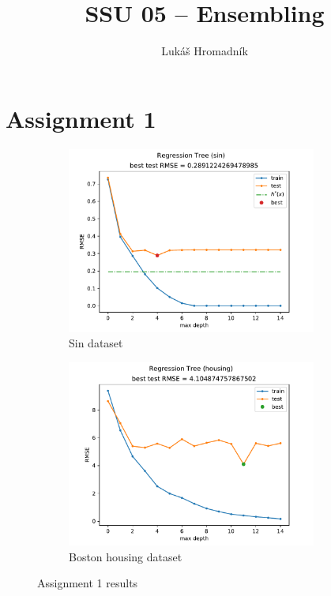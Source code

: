 \documentclass[12pt]{article}
\begin{document}
\title{SSU 05 – Ensembling}
\author{Lukáš Hromadník}
\date{}

\pagestyle{empty}
\maketitle
\thispagestyle{empty}

\pagestyle{plain}


\section{Assignment 1}

\begin{figure}[!h]
    \centering
    \begin{subfigure}[b]{0.49\textwidth}
        \centering
        \includegraphics[width=0.9\textwidth]{plots/01/regression_tree_sin.pdf}
        \caption{Sin dataset}
        \label{fig:01-sin}
    \end{subfigure}
    \begin{subfigure}[b]{0.49\textwidth}
        \centering
        \includegraphics[width=0.9\textwidth]{plots/01/regression_tree_housing.pdf}
        \caption{Boston housing dataset}
        \label{fig:01-housing}
    \end{subfigure}
    \caption{Assignment 1 results}
\end{figure}
\end{document}
